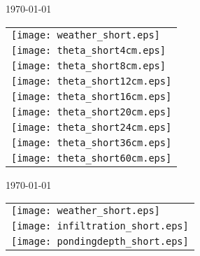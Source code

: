 \documentclass[a4paper]{article}
\begin{document}
\newpage
\today \\
%
\begin{tabular}{l}
\texttt{[image: weather\_short.eps]} \\
\texttt{[image: theta\_short4cm.eps]} \\
\texttt{[image: theta\_short8cm.eps]} \\
\texttt{[image: theta\_short12cm.eps]} \\
\texttt{[image: theta\_short16cm.eps]} \\
\texttt{[image: theta\_short20cm.eps]} \\
\texttt{[image: theta\_short24cm.eps]} \\
\texttt{[image: theta\_short36cm.eps]} \\
\texttt{[image: theta\_short60cm.eps]}
\end{tabular}

\newpage
\today \\
%
\begin{tabular}{l}
\texttt{[image: weather\_short.eps]} \\
\texttt{[image: infiltration\_short.eps]} \\
\texttt{[image: pondingdepth\_short.eps]}
\end{tabular}
\end{document}
